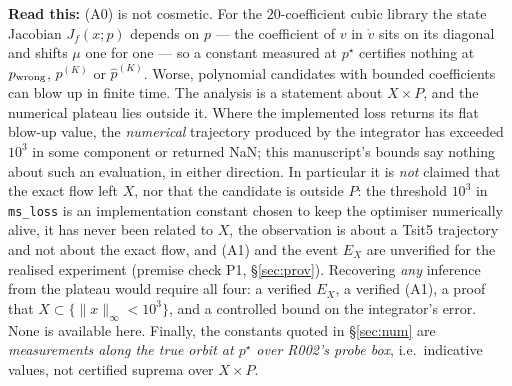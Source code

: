 \documentclass[11pt]{article}
\theoremstyle{remark}\newtheorem{remark}{Remark}
\newcommand{\pstar}{p^\star}
\newcommand{\norm}[1]{\lVert #1\rVert}
\newcommand{\readthis}[1]{\textbf{Read this:} #1}
\begin{document}
\readthis{(A0) is not cosmetic. For the $20$-coefficient cubic library the state Jacobian $J_f(x;p)$ depends on $p$ --- the coefficient of $v$ in $\dot v$ sits on its diagonal and shifts $\mu$ one for one --- so a constant measured at $\pstar$ certifies nothing at $p_{\rm wrong}$, $p^{(K)}$ or $\hat p^{(K)}$. Worse, polynomial candidates with bounded coefficients can blow up in finite time. The analysis is a statement about $X\times P$, and the numerical plateau lies outside it. Where the implemented loss returns its flat blow-up value, the \emph{numerical} trajectory produced by the integrator has exceeded $10^3$ in some component or returned NaN; this manuscript's bounds say nothing about such an evaluation, in either direction. In particular it is \emph{not} claimed that the exact flow left $X$, nor that the candidate is outside $P$: the threshold $10^3$ in \texttt{ms\_loss} is an implementation constant chosen to keep the optimiser numerically alive, it has never been related to $X$, the observation is about a Tsit5 trajectory and not about the exact flow, and (A1) and the event $E_X$ are unverified for the realised experiment (premise check P1, \S\ref{sec:prov}). Recovering \emph{any} inference from the plateau would require all four: a verified $E_X$, a verified (A1), a proof that $X\subset\{\norm x_\infty<10^3\}$, and a controlled bound on the integrator's error. None is available here. Finally, the constants quoted in \S\ref{sec:num} are \emph{measurements along the true orbit at $\pstar$ over R002's probe box}, i.e.\ indicative values, not certified suprema over $X\times P$.}
\end{document}
